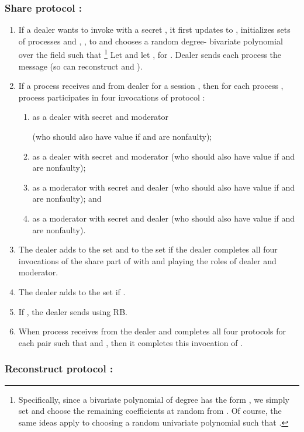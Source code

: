 \documentclass{sig-alternate}
\def\beginsmall#1{\vspace{-\parskip}\begin{#1}\itemsep-\parskip}
\def\endsmall#1{\end{#1}\vspace{-\parskip}}
\newcommand{\mwdavss}{\text{MW-SVSS}\xspace}
\begin{document}
\subsubsection*{Share protocol :}
\begin{enumerate}
\item If a dealer  wants to invoke  with a
secret , it first updates  to ,
initializes sets of processes  and , ,
to 
and
chooses
a random degree- bivariate polynomial
 over the field  such that \footnote{Specifically, since a bivariate polynomial of degree  has
the form , we simply set 
and choose the remaining coefficients at random from .  Of course,
the same ideas apply to choosing a  random univariate polynomial 
such that .}
Let  and let , for .
Dealer  sends each process 
the message 
(so  can reconstruct  and ).

\item If a process  receives  and  from dealer  for a
session , then for each process , process 
participates in four invocations of \mwdavss protocol :

    \beginsmall{enumerate}
\item as a dealer with secret  and moderator
    
(who should also have value   if  and  are
    nonfaulty);
\item as a dealer with secret  and moderator
     (who should also have value  if  and
     are nonfaulty);
\item as a moderator with secret  and dealer
     (who should also have value   if  and
     are nonfaulty); and
\item as a moderator with secret  and dealer
     (who should also have value   if  and
     are
    nonfaulty).
    \endsmall{enumerate}
\item The dealer  adds  to the set  and  to the
set  if
the dealer completes all four invocations of
the share part of
\mwdavss  with
 and  playing the roles of dealer and moderator.

\item The dealer  adds  to the set  if .

\item If , the dealer sends  using RB.

\item When process  receives  from the dealer and completes all four  protocols
for each pair  such that  and , then it completes this invocation of .
\end{enumerate}

\subsubsection*{Reconstruct protocol :}
\end{document}
